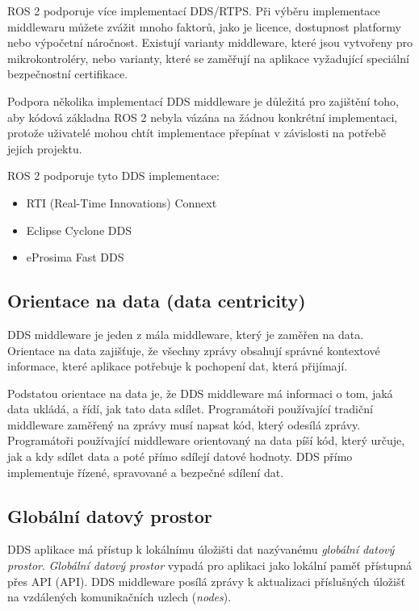 ROS 2 podporuje více implementací \acs{DDS}/RTPS. Při výběru implementace middlewaru můžete zvážit mnoho faktorů, jako je licence, dostupnost platformy nebo výpočetní náročnost. Existují varianty middleware, které jsou vytvořeny pro mikrokontroléry, nebo varianty, které se zaměřují na aplikace vyžadující speciální bezpečnostní certifikace.

Podpora několika implementací \acs{DDS} middleware je důležitá pro zajištění toho, aby kódová základna ROS 2 nebyla vázána na žádnou konkrétní implementaci, protože uživatelé mohou chtít implementace přepínat v závislosti na potřebě jejich projektu. \cite{ROS2DDS2}

ROS 2 podporuje tyto \acs{DDS} implementace:
\begin{itemize}
    \item RTI (Real-Time Innovations) Connext
    \item Eclipse Cyclone DDS
    \item eProsima Fast DDS
\end{itemize}

\subsection{Orientace na data (data centricity)}

\acs{DDS} middleware je jeden z mála middleware, který je zaměřen na data. Orientace na data zajišťuje, že všechny zprávy obsahují správné kontextové informace, které aplikace potřebuje k pochopení dat, která přijímají.

Podstatou orientace na data je, že \acs{DDS} middleware má informaci o tom, jaká data ukládá, a řídí, jak tato data sdílet. Programátoři používající tradiční middleware zaměřený na zprávy musí napsat kód, který odesílá zprávy. Programátoři používající middleware orientovaný na data píší kód, který určuje, jak a kdy sdílet data a poté přímo sdílejí datové hodnoty. \acs{DDS} přímo implementuje řízené, spravované a bezpečné sdílení dat. \cite{DDS_Main}

\subsection{Globální datový prostor}

\acs{DDS} aplikace má přístup k lokálnímu úložišti dat nazývanému \textit{globální datový prostor}. \textit{Globální datový prostor} vypadá pro aplikaci jako lokální paměť přístupná přes \acs{API} (\acl{API}). \acs{DDS} middleware posílá zprávy k aktualizaci příslušných úložišť na vzdálených komunikačních uzlech (\textit{nodes}).

